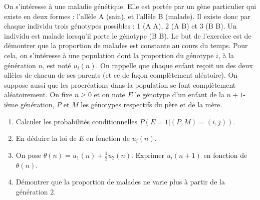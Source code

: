 \documentclass[../PolyS4.tex]{subfiles}
\begin{document}
On s'intéresse à une maladie génétique. Elle est portée par un gène particulier qui existe en deux formes : l'allèle A (sain), et l'allèle B (malade). Il existe donc par chaque individu trois génotypes possibles : 1 (A A), 2 (A B) et 3 (B B). Un individu est malade lorsqu'il porte le génotype (B B). Le but de l'exercice est de démontrer que la proportion de malades est constante au cours du temps.\newline
Pour cela, on s'intéresse à une population dont la proportion du génotype $i$, à la génération $n$, est noté $u_i(n)$. On rappelle que chaque enfant reçoit un des deux allèles de chacun de ses parents (et ce de façon complètement aléatoire). On suppose aussi que les procréations dans la population se font complètement aléatoirement.\newline
On fixe $n\geq 0$ et on note $E$ le génotype d'un enfant de la $n+1$-ième génération, $P$ et $M$ les génotypes respectifs du père et de la mère.
\begin{enumerate}
\item Calculer les probabilités conditionnelles $P(E=1| (P,M)=(i,j) )$.
\item En déduire la loi de $E$ en fonction de $u_i(n)$. 
\item On pose $\theta(n)=u_1(n)+\frac 12 u_2(n)$. Exprimer $u_{i}(n+1)$ en fonction de $\theta(n)$.
\item Démontrer que la proportion de malades ne varie plus à partir de la génération $2$.\\
\end{enumerate}



\end{document}
